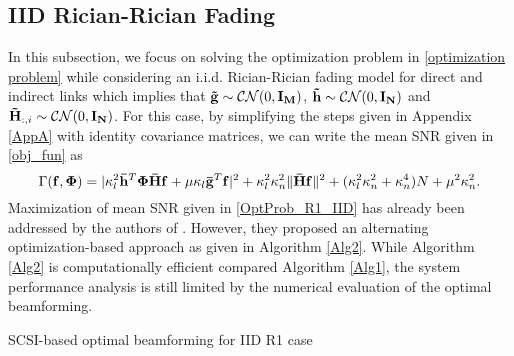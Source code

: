 \documentclass[journal,draftclsnofoot,onecolumn,12pt]{IEEEtran}
\begin{document}
\subsection{IID Rician-Rician Fading}\label{R1_IID}
In this subsection, we focus on solving the optimization problem in \eqref{optimization problem} while considering an {\rm i.i.d.} Rician-Rician fading model for direct and indirect links which implies that $\mathbf{\Tilde{g}}\sim\mathcal{C}\mathcal{N}(0,\mathbf{I_M})$, $\mathbf{\Tilde{h}}\sim\mathcal{C}\mathcal{N}(0,\mathbf{I_N})$ and $\mathbf{\Tilde{H}}_{:,i}\sim\mathcal{C}\mathcal{N}(0,\mathbf{I_N})$. For this case, by simplifying the steps given in Appendix \ref{AppA} with identity covariance matrices, we can write the  mean {\rm SNR} given in \eqref{obj_fun} as
\begin{equation}
    \Gamma(\mathbf{f},\mathbf{\Phi}) = |\kappa_l^2\mathbf{\Bar{h}}^T\mathbf{\Phi\Bar{H}f} + \mu\kappa_l\mathbf{\Bar{g}}^T\mathbf{f}|^2 + \kappa_l^2\kappa_n^2\|\mathbf{\Bar{H}f}\|^2 +  (\kappa_l^2\kappa_n^2+\kappa_n^4)N + \mu^2\kappa_n^2.  \label{OptProb_R1_IID}
\end{equation}
 Maximization of mean SNR given in \eqref{OptProb_R1_IID}  has already been addressed by the authors of \cite{hu2020statistical}. 
However, they proposed an alternating optimization-based approach as given in Algorithm \ref{Alg2}. While  Algorithm \ref{Alg2} is computationally efficient compared Algorithm \ref{Alg1}, the system performance analysis is still limited by the numerical evaluation of  the optimal beamforming. 
\begin{algorithm}[t!]\label{Alg2}
\caption{SCSI-based optimal beamforming for IID R1  case \cite{hu2020statistical}}
\end{algorithm}
\end{document}
